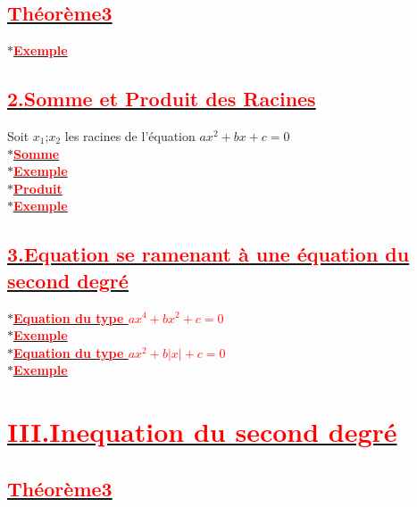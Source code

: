 \documentclass[12pt]{article}
\begin{document}
\subsection*{\underline{\textbf{\textcolor{red}{Théorème3}}}}
$\ast$\underline{\textbf{\textcolor{red}{Exemple}}}\\
\subsection*{\underline{\textbf{\textcolor{red}{2.Somme et Produit des Racines}}}}
Soit $x_{1}$;$x_{2}$ les racines de l'équation $ax^{2}+bx+c=0$\\
$\ast$\underline{\textbf{\textcolor{red}{Somme}}}\\
$\ast$\underline{\textbf{\textcolor{red}{Exemple}}}\\
$\ast$\underline{\textbf{\textcolor{red}{Produit}}}\\
$\ast$\underline{\textbf{\textcolor{red}{Exemple}}}\\
\subsection*{\underline{\textbf{\textcolor{red}{3.Equation se ramenant à une équation du second degré}}}}
$\ast$\underline{\textbf{\textcolor{red}{Equation du type $ax^{4}+bx^{2}+c=0$}}}\\
$\ast$\underline{\textbf{\textcolor{red}{Exemple}}}\\
$\ast$\underline{\textbf{\textcolor{red}{Equation du type $ax^{2}+b|x|+c=0$}}}\\
$\ast$\underline{\textbf{\textcolor{red}{Exemple}}}\\
\section*{\underline{\textbf{\textcolor{red}{III.Inequation du second degré}}}}
\subsection*{\underline{\textbf{\textcolor{red}{Théorème3}}}}
\end{document}
